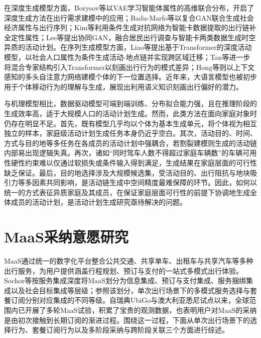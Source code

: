 在深度生成模型方面，Borysov等\citep{borysovHowGenerateMicroagents2019}以VAE学习智能体属性的高维联合分布，开启了深度生成方法在出行需求建模中的应用；Badu-Marfo等\citep{badu-marfoCompositeTravelGenerative2022}以复合GAN联合生成社会经济属性与出行序列；Kim等\citep{kimImputingQualitativeAttributes2022}利用条件生成对抗网络为智能卡数据提取的出行链补全定性属性；Lee等\citep{leeCollaborativeGenerativeAdversarial2025}提出协同GAN，融合居民出行调查与智能卡两类数据生成时空异质的活动计划。在序列生成模型方面，Liao等\citep{liaoDeepActivityModel2024}提出基于Transformer的深度活动模型，以社会人口属性为条件生成活动-地点链并实现跨区域迁移；Tan等\citep{tanMoETransMovTransformerbasedModel2025}进一步将混合专家结构引入Transformer以刻画出行行为的模式差异；Hong等\citep{hongContextawareMultiheadSelfattentional2023}则以上下文感知的多头自注意力网络建模个体的下一位置选择。近年来，大语言模型也被初步用于个体移动行为的理解与生成\citep{liangExploringLargeLanguage2024,gongMobilityLLMLearningVisiting2024}，展现出利用语义知识刻画出行偏好的潜力。

与机理模型相比，数据驱动模型可端到端训练、分布拟合能力强，且在推理阶段的生成效率高，适于大规模人口的活动计划生成\citep{nguyenLargescaleActivitybasedDemand2025}。然而，此类方法在面向家庭对象时仍存在明显不足。首先，既有模型几乎均以个体为基本生成单元，将个体视为相互独立的样本，家庭级活动计划生成任务本身仍近乎空白\citep{rezvanySimulatingIntrahouseholdInteractions2023}。其次，活动目的、时间、方式与目的地等多任务在各成员的活动计划中强耦合，若割裂建模则生成的活动链内部易出现逻辑失真。再次，诸如``同时驾车人数不得超过家庭车辆数''的车辆可用性硬性约束难以仅通过软损失或条件输入得到满足，生成结果在家庭层面的可行性缺乏保证。最后，目的地选择涉及大规模候选集，受活动目的、出行阻抗与地块吸引力等多因素共同影响，是活动链生成中空间精度最难保障的环节\citep{hongContextawareMultiheadSelfattentional2023,leeCollaborativeGenerativeAdversarial2025}。因此，如何以统一的方式表征异质家庭及其成员，在保证家庭层面可行性的前提下协调地生成全体成员的活动计划，是活动计划生成研究亟待解决的问题。

\section{MaaS采纳意愿研究}\label{sec.review.maas}

MaaS通过统一的数字化平台整合公共交通、共享单车、出租车与共享汽车等多种出行服务，为用户提供涵盖行程规划、预订与支付的一站式多模式出行体验\citep{kamargianniComprehensiveReviewMobility2016}。Sochor等\citep{sochorTopologicalApproachMobility2018}按服务集成深度将MaaS划分为信息集成、预订与支付集成、服务捆绑集成以及社会目标集成等层级；参照该划分，单次出行场景下的多模式服务选择与套餐订阅分别对应集成的不同等级\citep{mulleyMaaSRegionalRural2023}。自瑞典UbiGo与澳大利亚悉尼试点以来，全球范围内已开展了多轮MaaS试验\citep{jittrapiromMobilityServiceCritical2017,sochorTryingOutMobility2016,hensherMobilityServicePrivate2021}，积累了宝贵的观测数据，也表明用户对MaaS的采纳是由初次接触到长期订阅的渐进过程\citep{hoDriversParticipantsChoices2021}。围绕这一过程，下面从单次出行场景下的选择行为、套餐订阅行为以及多阶段采纳与跨阶段关联三个方面进行综述。

